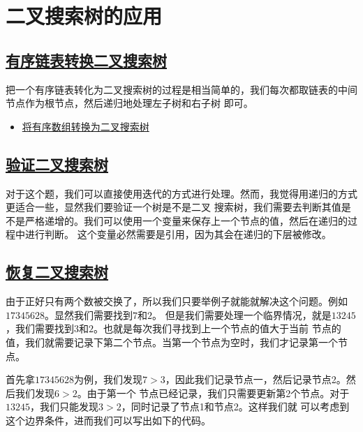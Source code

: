 \documentclass[../../main.tex]{subfiles}
\begin{document}


\section{二叉搜索树的应用}

\subsection{\href{https://leetcode.cn/problems/convert-sorted-list-to-binary-search-tree/}
{有序链表转换二叉搜索树}}

把一个有序链表转化为二叉搜索树的过程是相当简单的，我们每次都取链表的中间节点作为根节点，然后递归地处理左子树和右子树
即可。



\begin{kaobox}[title=类似题目]
  \begin{itemize}
    \item \href{https://leetcode.cn/problems/convert-sorted-array-to-binary-search-tree/}{将有序数组转换为二叉搜索树}
  \end{itemize}
\end{kaobox}

\subsection{\href{https://leetcode.cn/problems/convert-sorted-list-to-binary-search-tree/}
{验证二叉搜索树}}

对于这个题，我们可以直接使用迭代的方式进行处理。然而，我觉得用递归的方式更适合一些，显然我们要验证一个树是不是二叉
搜索树，我们需要去判断其值是不是严格递增的。我们可以使用一个变量来保存上一个节点的值，然后在递归的过程中进行判断。
这个变量必然需要是引用，因为其会在递归的下层被修改。



\subsection{\href{https://leetcode.cn/problems/recover-binary-search-tree/}{恢复二叉搜索树}}

由于正好只有两个数被交换了，所以我们只要举例子就能就解决这个问题。例如$17345628$。显然我们需要找到$7$和$2$。
但是我们需要处理一个临界情况，就是$13245$，我们需要找到$3$和$2$。也就是每次我们寻找到上一个节点的值大于当前
节点的值，我们就需要记录下第二个节点。当第一个节点为空时，我们才记录第一个节点。

首先拿$17345628$为例，我们发现$7 > 3$，因此我们记录节点一，然后记录节点2。然后我们发现$6 > 2$。由于第一个
节点已经记录，我们只需要更新第2个节点。对于$13245$，我们只能发现$3 > 2$，同时记录了节点1和节点2。这样我们就
可以考虑到这个边界条件，进而我们可以写出如下的代码。


\end{document}
